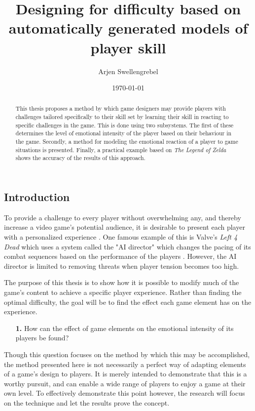 \documentclass[a4paper]{article}
\title{Designing for difficulty based on automatically generated models of player skill}
\author{Arjen Swellengrebel}
\date{\today}
\begin{document}
\maketitle

\begin{multicols*}{2}
\begin{abstract}
This thesis proposes a method by which game designers may provide players with challenges tailored specifically to their skill set by learning their skill in reacting to specific challenges in the game.
This is done using two subsystems. The first of these determines the level of emotional intensity of the player based on their behaviour in the game.
Secondly, a method for modeling the emotional reaction of a player to game situations is presented.
Finally, a practical example based on \emph{The Legend of Zelda} shows the accuracy of the results of this approach.
\end{abstract}

\section{Introduction} \label{introduction}
To provide a challenge to every player without overwhelming any, and thereby increase a video game's potential audience, it is desirable to present each player with a personalized experience \cite{playercentered}. One famous example of this is Valve's \emph{Left 4 Dead} which uses a system called the "AI director" which changes the pacing of its combat sequences based on the performance of the players \cite{left4dead}. However, the AI director is limited to removing threats when player tension becomes too high.

The purpose of this thesis is to show how it is possible to modify much of the game's content to achieve a specific player experience. Rather than finding the optimal difficulty, the goal will be to find the effect each game element has on the experience. 
\begin{itemize} \item[\textbf{1.}] How can the effect of game elements on the emotional intensity of its players be found? \end{itemize}
Though this question focuses on the method by which this may be accomplished, the method presented here is not necessarily a perfect way of adapting elements of a game's design to players. It is merely intended to demonstrate that this is a worthy pursuit, and can enable a wide range of players to enjoy a game at their own level. To effectively demonstrate this point however, the research will focus on the technique and let the results prove the concept.


\end{multicols*}
\end{document}
